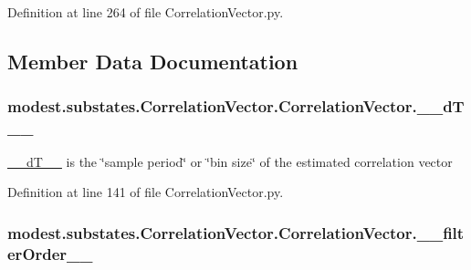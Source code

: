 Definition at line 264 of file Correlation\+Vector.\+py.



\subsection{Member Data Documentation}
\subsubsection[{\texorpdfstring{\+\_\+\+\_\+d\+T\+\_\+\+\_\+}{__dT__}}]{\setlength{\rightskip}{0pt plus 5cm}modest.\+substates.\+Correlation\+Vector.\+Correlation\+Vector.\+\_\+\+\_\+d\+T\+\_\+\+\_\+\hspace{0.3cm}{\ttfamily [private]}}\hypertarget{classmodest_1_1substates_1_1CorrelationVector_1_1CorrelationVector_a408e07f67ac7233c1b28265867d264d6}{}\label{classmodest_1_1substates_1_1CorrelationVector_1_1CorrelationVector_a408e07f67ac7233c1b28265867d264d6}


\hyperlink{classmodest_1_1substates_1_1CorrelationVector_1_1CorrelationVector_a408e07f67ac7233c1b28265867d264d6}{\+\_\+\+\_\+d\+T\+\_\+\+\_\+} is the \char`\"{}sample period\char`\"{} or \char`\"{}bin size\char`\"{} of the estimated correlation vector 



Definition at line 141 of file Correlation\+Vector.\+py.

\subsubsection[{\texorpdfstring{\+\_\+\+\_\+filter\+Order\+\_\+\+\_\+}{__filterOrder__}}]{\setlength{\rightskip}{0pt plus 5cm}modest.\+substates.\+Correlation\+Vector.\+Correlation\+Vector.\+\_\+\+\_\+filter\+Order\+\_\+\+\_\+\hspace{0.3cm}{\ttfamily [private]}}\hypertarget{classmodest_1_1substates_1_1CorrelationVector_1_1CorrelationVector_a939a2ca80dec51270e5df231d98983d5}{}\label{classmodest_1_1substates_1_1CorrelationVector_1_1CorrelationVector_a939a2ca80dec51270e5df231d98983d5}


